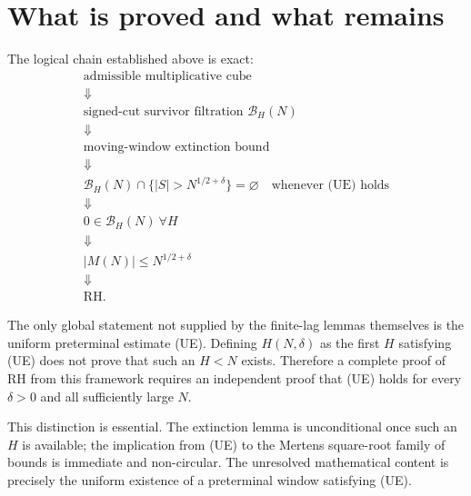 \documentclass[11pt]{article}
\theoremstyle{definition}
\theoremstyle{remark}
\newcommand{\BH}{\mathcal B}
\begin{document}
\section{What is proved and what remains}

The logical chain established above is exact:
\[
\boxed{
\begin{array}{c}
\text{admissible multiplicative cube}\\[1mm]
\Downarrow\\[1mm]
\text{signed-cut survivor filtration }\BH_H(N)\\[1mm]
\Downarrow\\[1mm]
\text{moving-window extinction bound}\\[1mm]
\Downarrow\\[1mm]
\BH_H(N)\cap\{|S|>N^{1/2+\delta}\}=\varnothing
\quad\text{whenever (UE) holds}\\[1mm]
\Downarrow\\[1mm]
0\in\BH_H(N)\ \forall H\\[1mm]
\Downarrow\\[1mm]
|M(N)|\le N^{1/2+\delta}\\[1mm]
\Downarrow\\[1mm]
\mathrm{RH}.
\end{array}
}
\]

The only global statement not supplied by the finite-lag lemmas themselves is the uniform preterminal estimate (UE).  Defining $H(N,\delta)$ as the first $H$ satisfying (UE) does not prove that such an $H<N$ exists.  Therefore a complete proof of RH from this framework requires an independent proof that (UE) holds for every $\delta>0$ and all sufficiently large $N$.

This distinction is essential.  The extinction lemma is unconditional once such an $H$ is available; the implication from (UE) to the Mertens square-root family of bounds is immediate and non-circular.  The unresolved mathematical content is precisely the uniform existence of a preterminal window satisfying (UE).
\end{document}
